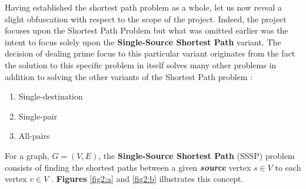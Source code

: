 \documentclass[a4paper, 12pt]{report}
\theoremstyle{definition}
\begin{document}
\noindent
Having established the shortest path problem as a whole, let us now reveal a slight obfuscation with respect to the scope of the project. Indeed, the project focuses upon the Shortest Path Problem but what was omitted earlier was the intent to focus solely upon the \textbf{Single-Source Shortest Path}
variant. The decision of dealing prime focus to this particular variant originates from the fact the solution to this specific problem in itself solves many other problems in addition to solving the other variants of the Shortest Path problem \cite{cormenBk,sedgewickBk}:

\begin{enumerate}
    \item Single-destination
    \item Single-pair
    \item All-pairs
\end{enumerate}

\noindent
For a graph, $G = (V, E)$, the \textbf{Single-Source Shortest Path} (SSSP) problem consists of finding the shortest paths between a given \textbf{\emph{source}} vertex $s \in V$ to each vertex $v \in V$ \cite{cormenBk,chaupis-et.al:2017}. \textbf{Figures} \ref{fig2:a} and \ref{fig2:b} illustrates this concept.
\end{document}
